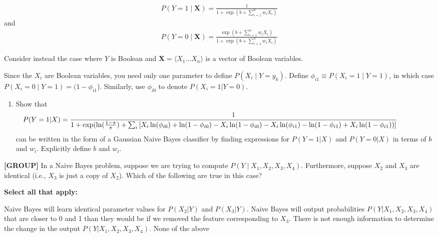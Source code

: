 \documentclass[11pt,addpoints,answers]{exam}
\newcommand{\Xv}{\mathbf{X}}
\newcommand{\group}{\textbf{[GROUP]} }
\begin{document}
\begin{questions}
\begin{align*}
    P(Y=1\mid\Xv)=\frac{1}{1+\exp(b+\sum_{i=1}^{n} w_iX_i)}
\end{align*}
and
\begin{align*}
    P(Y=0\mid\Xv)=\frac{\exp(b+\sum_{i=1}^{n} w_iX_i)}{1+\exp(b+\sum_{i=1}^{n} w_iX_i)}
\end{align*}

 Consider instead the case where $Y$ is Boolean and ${\Xv = \langle{X_{1}...X_{n}}}\rangle$ is a vector
of Boolean variables.


Since the $X_{i}$ are Boolean variables, you need only one parameter to define $P(X_{i}\mid{Y} = y_k)$. Define $\phi_{i1} \equiv P(X_{i} = 1\mid{Y = 1})$, in which case $P(X_{i} = 0\mid{Y = 1}) = (1-\phi_{i1}$). Similarly, use $\phi_{i0}$ to denote $P(X_{i} = 1|Y = 0)$. 

\begin{enumerate}
    \item Show that \footnotesize
        $$\hspace*{-15mm}P(Y=1|X) = \frac{1}{1+\exp(\ln(\frac{1-\pi}{\pi}) +\sum_i \left[X_i\ln(\phi_{i0}) + \ln(1-\phi_{i0}) - X_i\ln(1-\phi_{i0}) - X_i\ln(\phi_{i1}) - \ln(1-\phi_{i1}) + X_i\ln(1-\phi_{i1}))\right]}$$ 
        \normalsize
        can be written in the form of a Gaussian Naive Bayes classifier by finding expressions for $P(Y=1|X)$ and $P(Y=0|X)$ in terms of $b$ and $w_i$. Explicitly define $b$ and $w_i$.
        
        \begin{tcolorbox}[fit,height=10cm, blank, borderline={1pt}{-2pt},nobeforeafter]
    
    \end{tcolorbox}
        
\end{enumerate}

    
    \question[3] \group In a Naive Bayes problem, suppose we are trying to compute $P(Y\mid X_1,X_2,X_3,X_4)$.  Furthermore, suppose  $X_2$  and  $X_3$  are identical (i.e., $X_3$  is just a copy of $X_2$).  Which of the following are true in this case?

    \textbf{Select all that apply:}
    {\checkboxchar{$\Box$} \checkedchar{$\blacksquare$}
    \begin{checkboxes}
        \choice Naive Bayes will learn identical parameter values for $P(X_2|Y)$ and $P(X_3|Y)$.
        \choice Naive Bayes will output probabilities $P(Y|X_1,X_2,X_3,X_4)$ that are closer to 0 and 1 than they would be if we removed the feature corresponding to $X_3$.
        \choice There is not enough information to determine the change in the output $P(Y|X_1,X_2,X_3,X_4)$.
        \choice None of the above
    \end{checkboxes}
    }
    

\end{questions}
\end{document}
